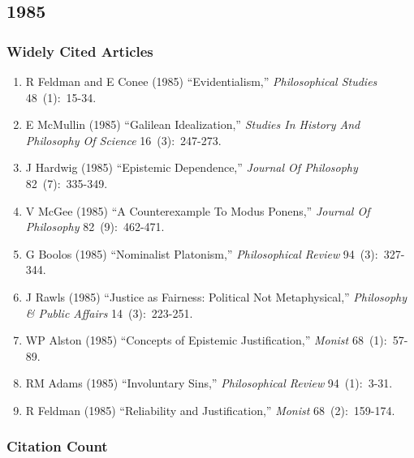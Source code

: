 \documentclass[
  10pt,
  letterpaper,
  DIV=11,
  numbers=noendperiod,
  twoside]{scrartcl}
\providecommand{\tightlist}{%
  \setlength{\itemsep}{0pt}\setlength{\parskip}{0pt}}\usepackage{longtable,booktabs,array}
\begin{document}
\newpage

\subsection{1985}\label{sec-s1985}

\subsubsection*{Widely Cited Articles}\label{widely-cited-articles-28}

\begin{enumerate}
\def\labelenumi{\arabic{enumi}.}
\tightlist
\item
  R Feldman and E Conee (1985) ``Evidentialism,'' \emph{Philosophical
  Studies} 48~(1):~15-34.
\item
  E McMullin (1985) ``Galilean Idealization,'' \emph{Studies In History
  And Philosophy Of Science} 16~(3):~247-273.
\item
  J Hardwig (1985) ``Epistemic Dependence,'' \emph{Journal Of
  Philosophy} 82~(7):~335-349.
\item
  V McGee (1985) ``A Counterexample To Modus Ponens,'' \emph{Journal Of
  Philosophy} 82~(9):~462-471.
\item
  G Boolos (1985) ``Nominalist Platonism,'' \emph{Philosophical Review}
  94~(3):~327-344.
\item
  J Rawls (1985) ``Justice as Fairness: Political Not Metaphysical,''
  \emph{Philosophy \& Public Affairs} 14~(3):~223-251.
\item
  WP Alston (1985) ``Concepts of Epistemic Justification,''
  \emph{Monist} 68~(1):~57-89.
\item
  RM Adams (1985) ``Involuntary Sins,'' \emph{Philosophical Review}
  94~(1):~3-31.
\item
  R Feldman (1985) ``Reliability and Justification,'' \emph{Monist}
  68~(2):~159-174.
\end{enumerate}

\subsubsection*{Citation Count}\label{sec-count-1985}
\end{document}
